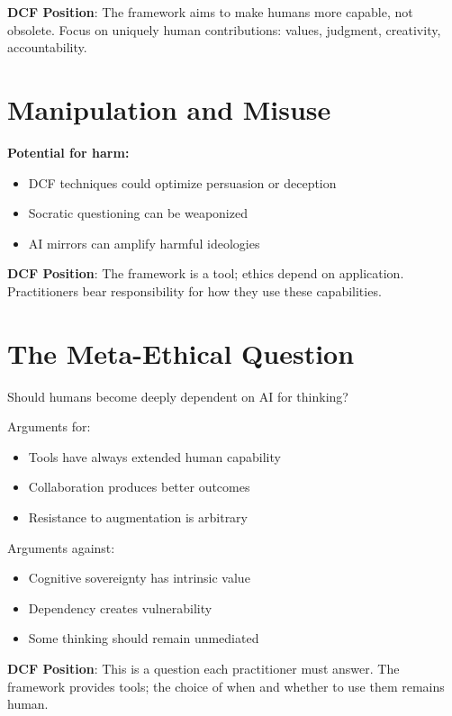 \textbf{DCF Position}: The framework aims to make humans more capable, not obsolete. Focus on uniquely human contributions: values, judgment, creativity, accountability.

\section{Manipulation and Misuse}

\textbf{Potential for harm:}
\begin{itemize}
    \item DCF techniques could optimize persuasion or deception
    \item Socratic questioning can be weaponized
    \item AI mirrors can amplify harmful ideologies
\end{itemize}

\textbf{DCF Position}: The framework is a tool; ethics depend on application. Practitioners bear responsibility for how they use these capabilities.

\section{The Meta-Ethical Question}

Should humans become deeply dependent on AI for thinking?

Arguments for:
\begin{itemize}
    \item Tools have always extended human capability
    \item Collaboration produces better outcomes
    \item Resistance to augmentation is arbitrary
\end{itemize}

Arguments against:
\begin{itemize}
    \item Cognitive sovereignty has intrinsic value
    \item Dependency creates vulnerability
    \item Some thinking should remain unmediated
\end{itemize}

\textbf{DCF Position}: This is a question each practitioner must answer. The framework provides tools; the choice of when and whether to use them remains human.


